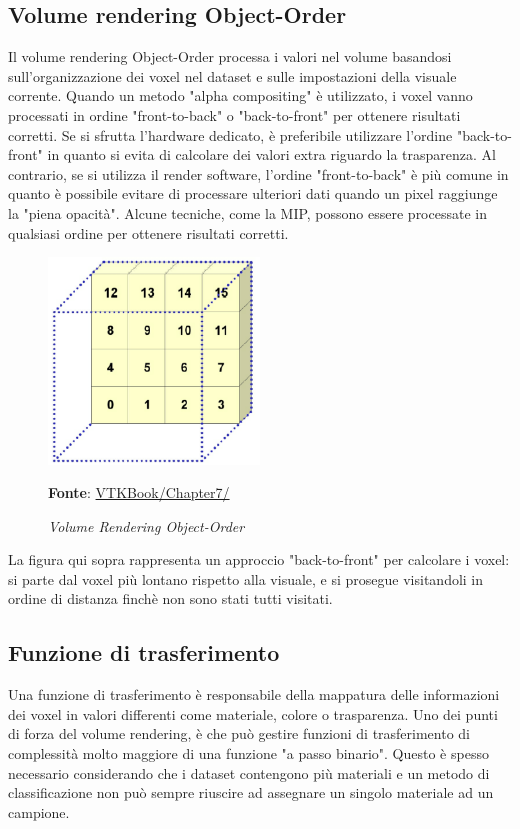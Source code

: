 \subsection{Volume rendering Object-Order}\label{sec:volume-object-order}
Il volume rendering Object-Order processa i valori nel volume basandosi sull'organizzazione dei voxel nel dataset e sulle impostazioni della visuale corrente. Quando un metodo "alpha compositing" è utilizzato, i voxel vanno processati in ordine "front-to-back" o "back-to-front" per ottenere risultati corretti. Se si sfrutta l'hardware dedicato, è preferibile utilizzare l'ordine "back-to-front" in quanto si evita di calcolare dei valori extra riguardo la trasparenza. Al contrario, se si utilizza il render software, l'ordine "front-to-back" è più comune in quanto è possibile evitare di processare ulteriori dati quando un pixel raggiunge la "piena opacità". Alcune tecniche, come la MIP, possono essere processate in qualsiasi ordine per ottenere risultati corretti.

\begin{figure}[h]
    \centering
    \includegraphics[width=0.5\textwidth]{immagini/volumerendering/objectorder.png}
    \caption{\textit{Volume Rendering Object-Order}}
    \textbf{Fonte}: \href{https://lorensen.github.io/VTKExamples/site/VTKBook/07Chapter7/}{VTKBook/Chapter7/}
    \label{fig: Volume Rendering Object-Order}
\end{figure}

La figura qui sopra rappresenta un approccio "back-to-front" per calcolare i voxel: si parte dal voxel più lontano rispetto alla visuale, e si prosegue visitandoli in ordine di distanza finchè non sono stati tutti visitati.

\subsection{Funzione di trasferimento}\label{sec:funzione-trasferimento}
Una funzione di trasferimento è responsabile della mappatura delle informazioni dei voxel in valori differenti come materiale, colore o trasparenza. Uno dei punti di forza del volume rendering, è che può gestire funzioni di trasferimento di complessità molto maggiore di una funzione "a passo binario". Questo è spesso necessario considerando che i dataset contengono più materiali e un metodo di classificazione non può sempre riuscire ad assegnare un singolo materiale ad un campione.

